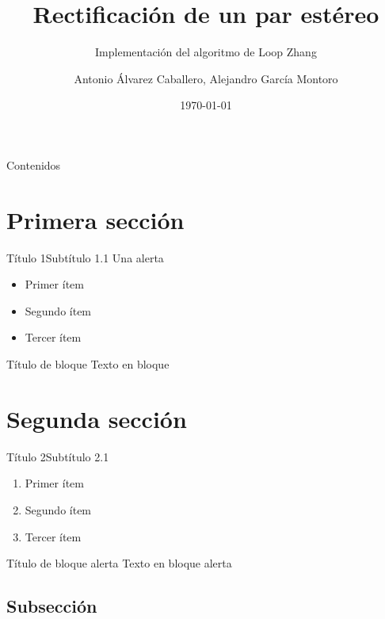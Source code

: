 \documentclass[aspectratio=169,14pt,spanish]{beamer}
\title[Rectificación]{Rectificación de un par estéreo}
\subtitle[Implementación de Loop Zhang]{Implementación del algoritmo de Loop Zhang}
\author[A. A. Caballero, A. G. Montoro]{Antonio Álvarez Caballero, Alejandro García Montoro}
\institute[UGR]{Universidad de Granada}
\date{\today}
\begin{document}
    \titlepage

    \begin{frame}[t]{Contenidos}
        \tableofcontents
    \end{frame}

    \section{Primera sección}

    \begin{frame}{Título 1}{Subtítulo 1.1}
        \alert{Una alerta}

        \begin{itemize}
            \item Primer ítem
            \item Segundo ítem
            \item Tercer ítem
        \end{itemize}

        \begin{block}{Título de bloque}
            Texto en bloque
        \end{block}
    \end{frame}

    \section{Segunda sección}

    \begin{frame}{Título 2}{Subtítulo 2.1}
        \begin{enumerate}
            \item Primer ítem
            \item Segundo ítem
            \item Tercer ítem
        \end{enumerate}

        \begin{alertblock}{Título de bloque alerta}
            Texto en bloque alerta
        \end{alertblock}
    \end{frame}

    \subsection{Subsección}
\end{document}
